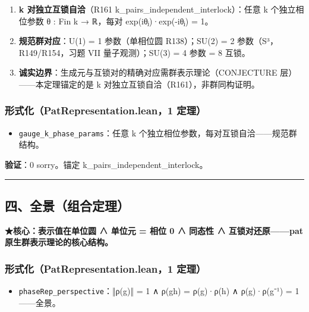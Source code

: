 \documentclass[
]{article}
\providecommand{\tightlist}{%
 \setlength{\itemsep}{0pt}\setlength{\parskip}{0pt}}
\begin{document}
\begin{enumerate}
\def\labelenumi{\arabic{enumi}.}
\tightlist
\item
 \textbf{k 对独立互锁自洽}（R161
 k\_pairs\_independent\_interlock）：任意 k 个独立相位参数 θ : Fin k →
 ℝ，每对 exp(iθⱼ)·exp(-iθⱼ) = 1。
\item
 \textbf{规范群对应}：U(1) = 1 参数（单相位圆 R138）；SU(2) = 2
 参数（S³，R149/R154，习题 VII 量子观测）；SU(3) = 4 参数 = 8 互锁。
\item
 \textbf{诚实边界}：生成元与互锁对的精确对应需群表示理论（CONJECTURE
 层）------本定理锚定的是 k 对独立互锁自洽（R161），非群同构证明。
\end{enumerate}

\subsubsection{形式化（PatRepresentation.lean，1
定理）}\label{ux5f62ux5f0fux5316patrepresentation.lean1-ux5b9aux7406}

\begin{itemize}
\tightlist
\item
 \texttt{gauge\_k\_phase\_params}：任意 k
 个独立相位参数，每对互锁自洽------规范群结构。
\end{itemize}

\textbf{验证}：0 sorry。锚定 k\_pairs\_independent\_interlock。

\begin{center}\rule{0.5\linewidth}{0.5pt}\end{center}

\subsection{四、全景（组合定理）}\label{ux56dbux5168ux666fux7ec4ux5408ux5b9aux7406}

\textbf{★核心：表示值在单位圆 ∧ 单位元 = 相位 0 ∧ 同态性 ∧
互锁对还原------pat 原生群表示理论的核心结构。}

\subsubsection{形式化（PatRepresentation.lean，1
定理）}\label{ux5f62ux5f0fux5316patrepresentation.lean1-ux5b9aux7406-1}

\begin{itemize}
\tightlist
\item
 \texttt{phaseRep\_perspective}：‖ρ(g)‖ = 1 ∧ ρ(gh) = ρ(g)·ρ(h) ∧
 ρ(g)·ρ(g⁻¹) = 1------全景。
\end{itemize}
\end{document}

